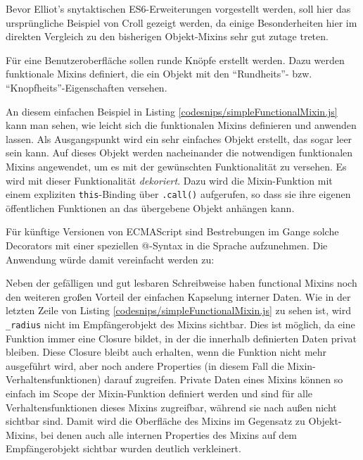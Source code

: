\skippingparagraph
Bevor Elliot's snytaktischen ES6-Erweiterungen vorgestellt werden, soll hier das ursprüngliche Beispiel von Croll gezeigt werden, da einige Besonderheiten hier im direkten Vergleich zu den bisherigen Objekt-Mixins sehr gut zutage treten.

Für eine Benutzeroberfläche sollen runde Knöpfe erstellt werden. Dazu werden funktionale Mixins definiert, die ein Objekt mit den "`Rundheits"'- bzw. "`Knopfheits"'-Eigenschaften versehen.


An diesem einfachen Beispiel in Listing \ref{codesnips/simpleFunctionalMixin.js} kann man sehen, wie leicht sich die funktionalen Mixins definieren und anwenden lassen. Als Ausgangspunkt wird ein sehr einfaches Objekt erstellt, das sogar leer sein kann. Auf dieses Objekt werden nacheinander die notwendigen funktionalen Mixins angewendet, um es mit der gewünschten Funktionalität zu versehen. Es wird mit dieser Funktionalität \emph{dekoriert}. Dazu wird die Mixin-Funktion mit einem expliziten \texttt{this}-Binding über \texttt{.call()} aufgerufen, so dass sie ihre eigenen öffentlichen Funktionen an das übergebene Objekt anhängen kann.

Für künftige Versionen von ECMAScript sind Bestrebungen im Gange solche Decorators mit einer speziellen @-Syntax in die Sprache aufzunehmen. Die Anwendung würde damit vereinfacht werden zu:

Neben der gefälligen und gut lesbaren Schreibweise haben functional Mixins noch den weiteren großen Vorteil der einfachen Kapselung interner Daten.
Wie in der letzten Zeile von Listing \ref{codesnips/simpleFunctionalMixin.js} zu sehen ist, wird \texttt{\_radius} nicht im Empfängerobjekt des Mixins sichtbar. 
Dies ist möglich, da eine Funktion immer eine Closure bildet, in der die innerhalb definierten Daten privat bleiben. Diese Closure bleibt auch erhalten, wenn die Funktion nicht mehr ausgeführt wird, aber noch andere Properties (in diesem Fall die Mixin-Verhaltensfunktionen) darauf zugreifen. Private Daten eines Mixins können so einfach im Scope der Mixin-Funktion definiert werden und sind für alle Verhaltensfunktionen dieses Mixins zugreifbar, während sie nach außen nicht sichtbar sind. Damit wird die Oberfläche des Mixins im Gegensatz zu Objekt-Mixins, bei denen auch alle internen Properties des Mixins auf dem Empfängerobjekt sichtbar wurden deutlich verkleinert.

